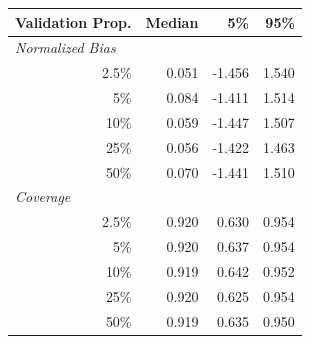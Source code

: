
\begin{tabular}{r|rrr}
\toprule
Validation Prop. & Median & 5\% & 95\%\\
\midrule
\multicolumn{1}{l|}{\textit{Normalized Bias}}\\
2.5\% & 0.051 & -1.456 & 1.540\\
5\% & 0.084 & -1.411 & 1.514\\
10\% & 0.059 & -1.447 & 1.507\\
25\% & 0.056 & -1.422 & 1.463\\
50\% & 0.070 & -1.441 & 1.510\\
\midrule
%
\multicolumn{1}{l|}{\textit{Coverage}}\\
2.5\% & 0.920 & 0.630 & 0.954\\
5\% & 0.920 & 0.637 & 0.954\\
10\% & 0.919 & 0.642 & 0.952\\
25\% & 0.920 & 0.625 & 0.954\\
50\% & 0.919 & 0.635 & 0.950\\
\bottomrule
\end{tabular}
